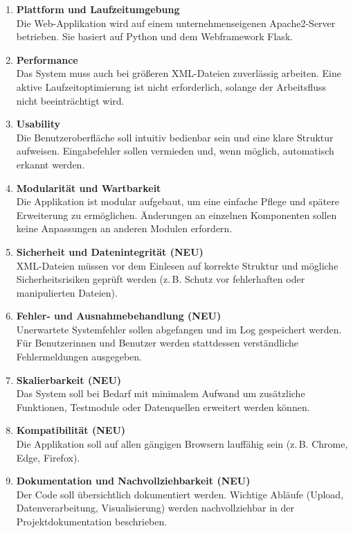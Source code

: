 \begin{enumerate}
  \item \textbf{Plattform und Laufzeitumgebung} \\
  Die Web-Applikation wird auf einem unternehmenseigenen Apache2-Server betrieben.
  Sie basiert auf Python und dem Webframework Flask.

  \item \textbf{Performance} \\
  Das System muss auch bei größeren XML-Dateien zuverlässig arbeiten.
  Eine aktive Laufzeitoptimierung ist nicht erforderlich, solange der Arbeitsfluss nicht beeinträchtigt wird.

  \item \textbf{Usability} \\
  Die Benutzeroberfläche soll intuitiv bedienbar sein und eine klare Struktur aufweisen.
  Eingabefehler sollen vermieden und, wenn möglich, automatisch erkannt werden.

  \item \textbf{Modularität und Wartbarkeit} \\
  Die Applikation ist modular aufgebaut, um eine einfache Pflege und spätere Erweiterung zu ermöglichen.
  Änderungen an einzelnen Komponenten sollen keine Anpassungen an anderen Modulen erfordern.

  \item \textbf{Sicherheit und Datenintegrität \textbf{(NEU)}} \\
  XML-Dateien müssen vor dem Einlesen auf korrekte Struktur und mögliche Sicherheitsrisiken geprüft werden
  (z.\,B. Schutz vor fehlerhaften oder manipulierten Dateien).

  \item \textbf{Fehler- und Ausnahmebehandlung \textbf{(NEU)}} \\
  Unerwartete Systemfehler sollen abgefangen und im Log gespeichert werden.
  Für Benutzerinnen und Benutzer werden stattdessen verständliche Fehlermeldungen ausgegeben.

  \item \textbf{Skalierbarkeit \textbf{(NEU)}} \\
  Das System soll bei Bedarf mit minimalem Aufwand um zusätzliche Funktionen, Testmodule oder Datenquellen erweitert werden können.

  \item \textbf{Kompatibilität \textbf{(NEU)}} \\
  Die Applikation soll auf allen gängigen Browsern lauffähig sein (z.\,B. Chrome, Edge, Firefox).

  \item \textbf{Dokumentation und Nachvollziehbarkeit \textbf{(NEU)}} \\
  Der Code soll übersichtlich dokumentiert werden.
  Wichtige Abläufe (Upload, Datenverarbeitung, Visualisierung) werden nachvollziehbar in der Projektdokumentation beschrieben.
\end{enumerate}

